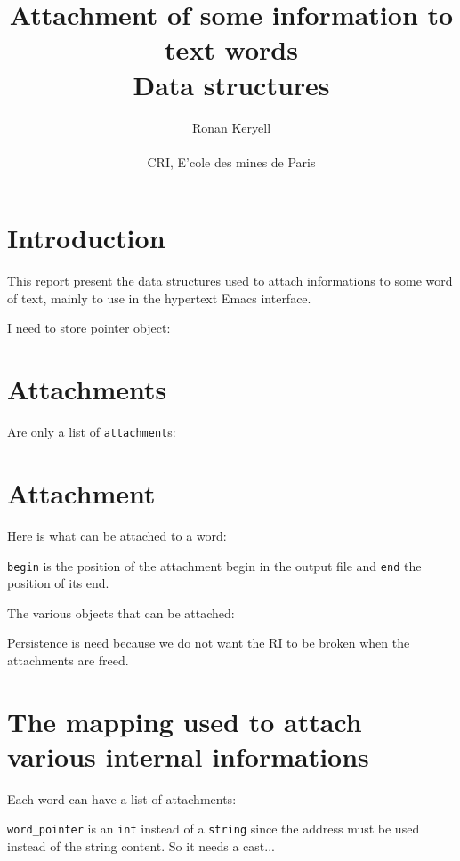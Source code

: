 \documentclass[a4paper]{article}
\title{Attachment of some information to text words\\Data structures}
\author{Ronan Keryell\\
                \\
        CRI, E'cole des mines de Paris}
\begin{document}
\section*{Introduction}

This report present the data structures used to attach
informations to some word of text, mainly to use in the hypertext Emacs
interface.


I need to store pointer object:

\section{Attachments}

Are only a list of {\tt attachment}s:



\section{Attachment}

Here is what can be attached to a word:


{\tt begin} is the position of the attachment begin in the output
file and {\tt end} the position of its end.

The various objects that can be attached:

Persistence is need because we do not want the RI to be broken when
the attachments are freed.



\section{The mapping used to attach various internal informations}


Each word can have a list of attachments:

\verb|word_pointer| is an {\tt int} instead of a {\tt string} since
the address must be used instead of the string content. So it needs a
cast...
\end{document}
